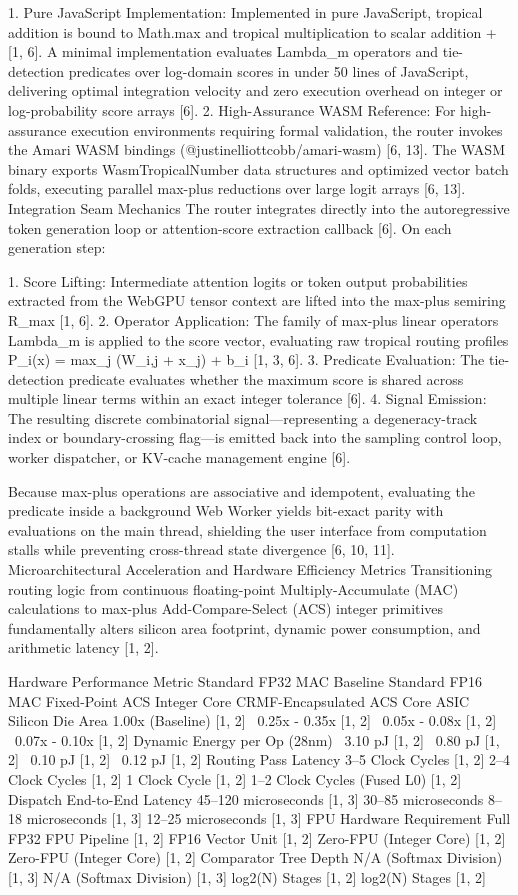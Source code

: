 1. Pure JavaScript Implementation: Implemented in pure JavaScript, tropical addition is bound to Math.max and tropical multiplication to scalar addition + [1, 6]. A minimal implementation evaluates Lambda_m operators and tie-detection predicates over log-domain scores in under 50 lines of JavaScript, delivering optimal integration velocity and zero execution overhead on integer or log-probability score arrays [6].
2. High-Assurance WASM Reference: For high-assurance execution environments requiring formal validation, the router invokes the Amari WASM bindings (@justinelliottcobb/amari-wasm) [6, 13]. The WASM binary exports WasmTropicalNumber data structures and optimized vector batch folds, executing parallel max-plus reductions over large logit arrays [6, 13].
Integration Seam Mechanics
The router integrates directly into the autoregressive token generation loop or attention-score extraction callback [6]. On each generation step:


1. Score Lifting: Intermediate attention logits or token output probabilities extracted from the WebGPU tensor context are lifted into the max-plus semiring R_max [1, 6].
2. Operator Application: The family of max-plus linear operators Lambda_m is applied to the score vector, evaluating raw tropical routing profiles P_i(x) = max_j (W_{i,j} + x_j) + b_i [1, 3, 6].
3. Predicate Evaluation: The tie-detection predicate evaluates whether the maximum score is shared across multiple linear terms within an exact integer tolerance [6].
4. Signal Emission: The resulting discrete combinatorial signal—representing a degeneracy-track index or boundary-crossing flag—is emitted back into the sampling control loop, worker dispatcher, or KV-cache management engine [6].


Because max-plus operations are associative and idempotent, evaluating the predicate inside a background Web Worker yields bit-exact parity with evaluations on the main thread, shielding the user interface from computation stalls while preventing cross-thread state divergence [6, 10, 11].
Microarchitectural Acceleration and Hardware Efficiency Metrics
Transitioning routing logic from continuous floating-point Multiply-Accumulate (MAC) calculations to max-plus Add-Compare-Select (ACS) integer primitives fundamentally alters silicon area footprint, dynamic power consumption, and arithmetic latency [1, 2].


Hardware Performance Metric
	Standard FP32 MAC Baseline
	Standard FP16 MAC
	Fixed-Point ACS Integer Core
	CRMF-Encapsulated ACS Core
	ASIC Silicon Die Area
	1.00x (Baseline) [1, 2]
	~0.25x - 0.35x [1, 2]
	~0.05x - 0.08x [1, 2]
	~0.07x - 0.10x [1, 2]
	Dynamic Energy per Op (28nm)
	~3.10 pJ [1, 2]
	~0.80 pJ [1, 2]
	~0.10 pJ [1, 2]
	~0.12 pJ [1, 2]
	Routing Pass Latency
	3–5 Clock Cycles [1, 2]
	2–4 Clock Cycles [1, 2]
	1 Clock Cycle [1, 2]
	1–2 Clock Cycles (Fused L0) [1, 2]
	Dispatch End-to-End Latency
	45–120 microseconds [1, 3]
	30–85 microseconds
	8–18 microseconds [1, 3]
	12–25 microseconds [1, 3]
	FPU Hardware Requirement
	Full FP32 FPU Pipeline [1, 2]
	FP16 Vector Unit [1, 2]
	Zero-FPU (Integer Core) [1, 2]
	Zero-FPU (Integer Core) [1, 2]
	Comparator Tree Depth
	N/A (Softmax Division) [1, 3]
	N/A (Softmax Division) [1, 3]
	log2(N) Stages [1, 2]
	log2(N) Stages [1, 2]
	

